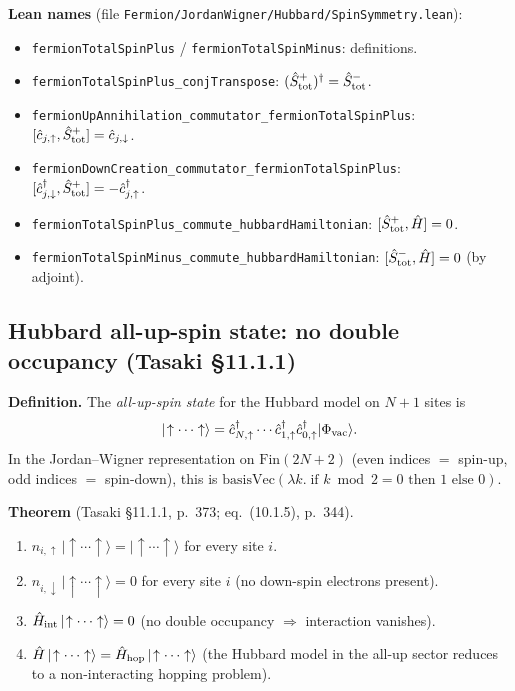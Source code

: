 \documentclass[a4paper,11pt]{article}
\begin{document}
\noindent\textbf{Lean names} (file \texttt{Fermion/JordanWigner/Hubbard/SpinSymmetry.lean}):
\begin{itemize}
  \item \texttt{fermionTotalSpinPlus} / \texttt{fermionTotalSpinMinus}: definitions.
  \item \texttt{fermionTotalSpinPlus\_conjTranspose}:
    $(\hat S^+_{\rm tot})^\dagger = \hat S^-_{\rm tot}$.
  \item \texttt{fermionUpAnnihilation\_commutator\_fermionTotalSpinPlus}:
    $[\hat c_{j,\uparrow}, \hat S^+_{\rm tot}] = \hat c_{j,\downarrow}$.
  \item \texttt{fermionDownCreation\_commutator\_fermionTotalSpinPlus}:
    $[\hat c^\dagger_{j,\downarrow}, \hat S^+_{\rm tot}] = -\hat c^\dagger_{j,\uparrow}$.
  \item \texttt{fermionTotalSpinPlus\_commute\_hubbardHamiltonian}:
    $[\hat S^+_{\rm tot}, \hat H] = 0$.
  \item \texttt{fermionTotalSpinMinus\_commute\_hubbardHamiltonian}:
    $[\hat S^-_{\rm tot}, \hat H] = 0$ (by adjoint).
\end{itemize}

\subsection{Hubbard all-up-spin state: no double occupancy (Tasaki §11.1.1)}
\label{subsec:hubbard-allup-state}

\noindent\textbf{Definition.}
The \emph{all-up-spin state} for the Hubbard model on $N+1$ sites is
\[
  |\!\uparrow\cdots\uparrow\rangle
  = \hat c^\dagger_{N,\uparrow}\cdots\hat c^\dagger_{1,\uparrow}
    \hat c^\dagger_{0,\uparrow}|\Phi_{\rm vac}\rangle.
\]
In the Jordan--Wigner representation on $\mathrm{Fin}(2N+2)$
(even indices $= $ spin-up, odd indices $=$ spin-down), this is
$\mathrm{basisVec}(\lambda k.\; \text{if } k \bmod 2 = 0 \text{ then } 1 \text{ else } 0)$.

\noindent\textbf{Theorem} (Tasaki §11.1.1, p.~373; eq.~(10.1.5), p.~344).
\begin{enumerate}
\item $\hat n_{i,\uparrow}\,|\!\uparrow\cdots\uparrow\rangle
        = |\!\uparrow\cdots\uparrow\rangle$ for every site $i$.
\item $\hat n_{i,\downarrow}\,|\!\uparrow\cdots\uparrow\rangle
        = 0$ for every site $i$ (no down-spin electrons present).
\item $\hat H_{\rm int}\,|\!\uparrow\cdots\uparrow\rangle = 0$
        (no double occupancy $\Rightarrow$ interaction vanishes).
\item $\hat H\,|\!\uparrow\cdots\uparrow\rangle
        = \hat H_{\rm hop}\,|\!\uparrow\cdots\uparrow\rangle$
        (the Hubbard model in the all-up sector reduces to
        a non-interacting hopping problem).
\end{enumerate}
\end{document}

